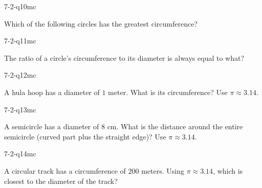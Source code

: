 \begin{practiceQuestion}{7-2-q10}{mc}
\begin{questionText}
Which of the following circles has the greatest circumference?
\end{questionText}
\end{practiceQuestion}

\begin{practiceQuestion}{7-2-q11}{mc}
\begin{questionText}
The ratio of a circle's circumference to its diameter is always equal to what?
\end{questionText}
\choiceB{$\pi$}
\end{practiceQuestion}

\begin{practiceQuestion}{7-2-q12}{mc}
\begin{questionText}
A hula hoop has a diameter of $1$ meter. What is its circumference? Use $\pi \approx 3.14$.
\end{questionText}
\end{practiceQuestion}

\begin{practiceQuestion}{7-2-q13}{mc}
\begin{questionText}
A semicircle has a diameter of $8$ cm. What is the distance around the entire semicircle (curved part plus the straight edge)? Use $\pi \approx 3.14$.
\end{questionText}
\end{practiceQuestion}

\begin{practiceQuestion}{7-2-q14}{mc}
\begin{questionText}
A circular track has a circumference of $200$ meters. Using $\pi \approx 3.14$, which is closest to the diameter of the track?
\end{questionText}
\end{practiceQuestion}

